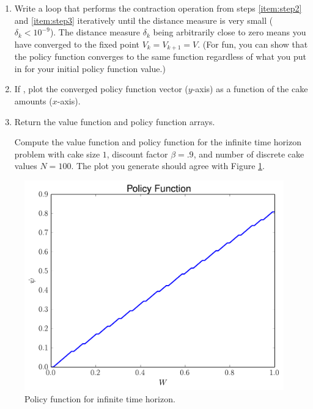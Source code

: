 \begin{problem}
\begin{enumerate}
\item Write a loop that performs the contraction operation from steps \ref{item:step2} and \ref{item:step3} iteratively
until the distance measure is very small ($\delta_k < 10^{-9}$).  The distance measure $\delta_k$ being arbitrarily close to zero means
 you have converged to the fixed point $V_k = V_{k+1} = V$. (For fun, you can show that the policy function converges to the same
 function regardless of what you put in for your initial policy function value.)

\item If , plot the converged policy function vector
($y$-axis) as a function of the cake amounts ($x$-axis).

\item Return the value function and policy function arrays.

Compute the value function and policy function for the infinite time horizon problem with
cake size $1$, discount factor $\beta = .9$, and number of
discrete cake values $N = 100$. The plot you generate should agree with Figure \ref{fig:infinitePolicy}.
\end{enumerate}
\end{problem}

\begin{figure}
\includegraphics[width=\textwidth]{infiniteHorizon.pdf}
\caption{Policy function for infinite time horizon.}
\label{fig:infinitePolicy}
\end{figure}

